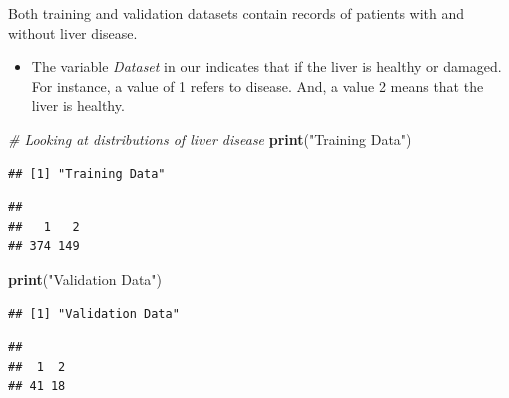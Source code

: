 \documentclass[]{article}
\newenvironment{Shaded}{\begin{snugshade}}{\end{snugshade}}
\newcommand{\CommentTok}[1]{\textcolor[rgb]{0.56,0.35,0.01}{\textit{#1}}}
\newcommand{\KeywordTok}[1]{\textcolor[rgb]{0.13,0.29,0.53}{\textbf{#1}}}
\newcommand{\NormalTok}[1]{#1}
\newcommand{\OperatorTok}[1]{\textcolor[rgb]{0.81,0.36,0.00}{\textbf{#1}}}
\newcommand{\StringTok}[1]{\textcolor[rgb]{0.31,0.60,0.02}{#1}}
\begin{document}
Both training and validation datasets contain records of patients with
and without liver disease.

\begin{itemize}
\item The variable \emph{Dataset} in our indicates that if the liver is healthy or damaged. For instance, a value of 1 refers to disease. And, a value 2 means that the liver is healthy.
\end{itemize}

\begin{Shaded}
\begin{Highlighting}[]
\CommentTok{# Looking at distributions of liver disease}
\KeywordTok{print}\NormalTok{(}\StringTok{"Training Data"}\NormalTok{)}
\end{Highlighting}
\end{Shaded}

\begin{verbatim}
## [1] "Training Data"
\end{verbatim}

\begin{Shaded}
\end{Shaded}

\begin{verbatim}
## 
##   1   2 
## 374 149
\end{verbatim}

\begin{Shaded}
\begin{Highlighting}[]
\KeywordTok{print}\NormalTok{(}\StringTok{"Validation Data"}\NormalTok{)}
\end{Highlighting}
\end{Shaded}

\begin{verbatim}
## [1] "Validation Data"
\end{verbatim}

\begin{Shaded}
\end{Shaded}

\begin{verbatim}
## 
##  1  2 
## 41 18
\end{verbatim}
\end{document}
